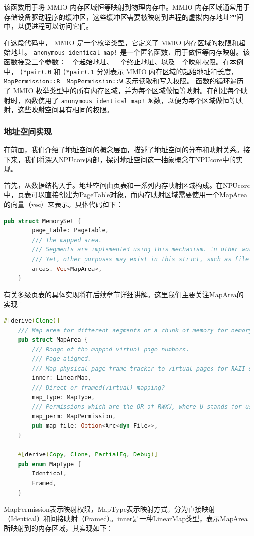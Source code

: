 该函数用于将 MMIO 内存区域恒等映射到物理内存中。MMIO
内存区域通常⽤于存储设备驱动程序的缓冲区，这些缓冲区需要被映射到进程的虚拟内存地址空间中，以便进程可以访问它们。

在这段代码中， MMIO 是一个枚举类型，它定义了 MMIO
内存区域的权限和起始地址。 \texttt{anonymous\_identical\_map!}
是一个匿名函数，用于做恒等内存映射。该函数接受三个参数：一个起始地址、一个终止地址、以及一个映射权限。在本例中，
\texttt{(*pair).0} 和 \texttt{(*pair).1} 分别表示 MMIO 内存区域的起始地址和长度，
\texttt{MapPermission::R\ \textbar{}\ MapPermission::W}
表示读取和写入权限。 函数的循环遍历了 MMIO
枚举类型中的所有内存区域，并为每个区域做恒等映射。在创建每个映射时，函数使用了 \texttt{anonymous\_identical\_map!} 函数，以便为每个区域做恒等映射，这些映射空间具有相同的权限。

\subsubsection{地址空间实现}

在前面，我们介绍了地址空间的概念层面，描述了地址空间的分布和映射关系。接下来，我们将深入NPUcore内部，探讨地址空间这一抽象概念在NPUcore中的实现。

首先，从数据结构入手。地址空间由页表和一系列内存映射区域构成。在NPUcore中，页表可以直接创建为PageTable对象，而内存映射区域需要使用一个MapArea的向量（vec）来表示。具体代码如下：

\begin{lstlisting}[language={Rust}, label={code:MemorySet}, caption={MemorySet}]
	pub struct MemorySet {
		page_table: PageTable,
		/// The mapped area.
		/// Segments are implemented using this mechanism. In other words, they may be considered a subset of MapArea.
		/// Yet, other purposes may exist in this struct, such as file mapping.
		areas: Vec<MapArea>,
	}
\end{lstlisting}
有关多级页表的具体实现将在后续章节详细讲解。这里我们主要关注MapArea的实现：

\begin{lstlisting}[language={Rust}, label={code:MapArea}, caption={MapArea}]
	#[derive(Clone)]
	/// Map area for different segments or a chunk of memory for memory mapped file access.
	pub struct MapArea {
		/// Range of the mapped virtual page numbers.
		/// Page aligned.
		/// Map physical page frame tracker to virtual pages for RAII & lookup.
		inner: LinearMap,
		/// Direct or framed(virtual) mapping?
		map_type: MapType,
		/// Permissions which are the OR of RWXU, where U stands for user.
		map_perm: MapPermission,
		pub map_file: Option<Arc<dyn File>>,
	}
	
	#[derive(Copy, Clone, PartialEq, Debug)]
	pub enum MapType {
		Identical,
		Framed,
	}
\end{lstlisting}
MapPermission表示映射权限，MapType表示映射方式，分为直接映射（Identical）和间接映射（Framed）。inner是一种LinearMap类型，表示MapArea所映射到的内存区域，其实现如下：

